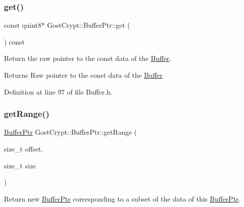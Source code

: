 \subsubsection{\texorpdfstring{get()}{get()}\hspace{0.1cm}{\footnotesize\ttfamily [2/2]}}
{\footnotesize\ttfamily const quint8$\ast$ Gost\+Crypt\+::\+Buffer\+Ptr\+::get (\begin{DoxyParamCaption}{ }\end{DoxyParamCaption}) const\hspace{0.3cm}{\ttfamily [inline]}}



Return the raw pointer to the const data of the \hyperlink{class_gost_crypt_1_1_buffer}{Buffer}. 

\begin{DoxyReturn}{Returns}
Raw pointer to the const data of the \hyperlink{class_gost_crypt_1_1_buffer}{Buffer} 
\end{DoxyReturn}


Definition at line 97 of file Buffer.\+h.

\mbox{\label{class_gost_crypt_1_1_buffer_ptr_a07410949bd2a46ed7cd1cfc9669b2113}} 
\subsubsection{\texorpdfstring{get\+Range()}{getRange()}\hspace{0.1cm}{\footnotesize\ttfamily [1/2]}}
{\footnotesize\ttfamily \hyperlink{class_gost_crypt_1_1_buffer_ptr}{Buffer\+Ptr} Gost\+Crypt\+::\+Buffer\+Ptr\+::get\+Range (\begin{DoxyParamCaption}\item[{size\+\_\+t}]{offset,  }\item[{size\+\_\+t}]{size }\end{DoxyParamCaption})}



Return new \hyperlink{class_gost_crypt_1_1_buffer_ptr}{Buffer\+Ptr} corresponding to a subset of the data of this \hyperlink{class_gost_crypt_1_1_buffer_ptr}{Buffer\+Ptr}. 


